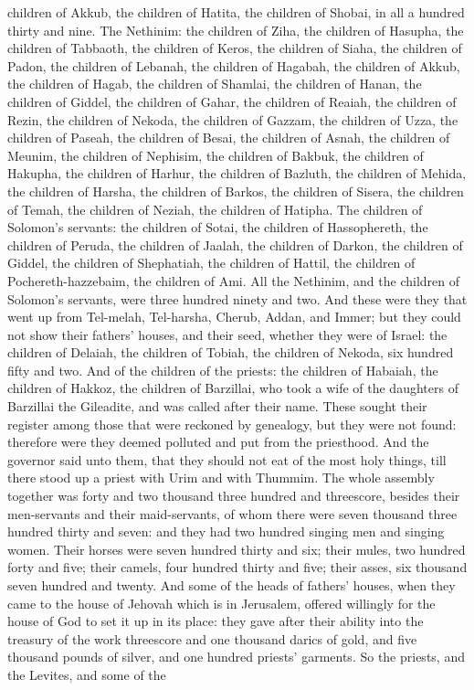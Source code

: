 children of Akkub, the children of Hatita, the children of Shobai, in all a hundred thirty and nine.  The Nethinim: the children of Ziha, the children of Hasupha, the children of Tabbaoth, the children of Keros, the children of Siaha, the children of Padon, the children of Lebanah, the children of Hagabah, the children of Akkub, the children of Hagab, the children of Shamlai, the children of Hanan, the children of Giddel, the children of Gahar, the children of Reaiah, the children of Rezin, the children of Nekoda, the children of Gazzam, the children of Uzza, the children of Paseah, the children of Besai, the children of Asnah, the children of Meunim, the children of Nephisim, the children of Bakbuk, the children of Hakupha, the children of Harhur, the children of Bazluth, the children of Mehida, the children of Harsha, the children of Barkos, the children of Sisera, the children of Temah, the children of Neziah, the children of Hatipha.  The children of Solomon’s servants: the children of Sotai, the children of Hassophereth, the children of Peruda, the children of Jaalah, the children of Darkon, the children of Giddel, the children of Shephatiah, the children of Hattil, the children of Pochereth-hazzebaim, the children of Ami. All the Nethinim, and the children of Solomon’s servants, were three hundred ninety and two.  And these were they that went up from Tel-melah, Tel-harsha, Cherub, Addan, and Immer; but they could not show their fathers’ houses, and their seed, whether they were of Israel: the children of Delaiah, the children of Tobiah, the children of Nekoda, six hundred fifty and two. And of the children of the priests: the children of Habaiah, the children of Hakkoz, the children of Barzillai, who took a wife of the daughters of Barzillai the Gileadite, and was called after their name. These sought their register among those that were reckoned by genealogy, but they were not found: therefore were they deemed polluted and put from the priesthood. And the governor said unto them, that they should not eat of the most holy things, till there stood up a priest with Urim and with Thummim.  The whole assembly together was forty and two thousand three hundred and threescore, besides their men-servants and their maid-servants, of whom there were seven thousand three hundred thirty and seven: and they had two hundred singing men and singing women. Their horses were seven hundred thirty and six; their mules, two hundred forty and five; their camels, four hundred thirty and five; their asses, six thousand seven hundred and twenty.  And some of the heads of fathers’ houses, when they came to the house of Jehovah which is in Jerusalem, offered willingly for the house of God to set it up in its place: they gave after their ability into the treasury of the work threescore and one thousand darics of gold, and five thousand pounds of silver, and one hundred priests’ garments.  So the priests, and the Levites, and some of the 